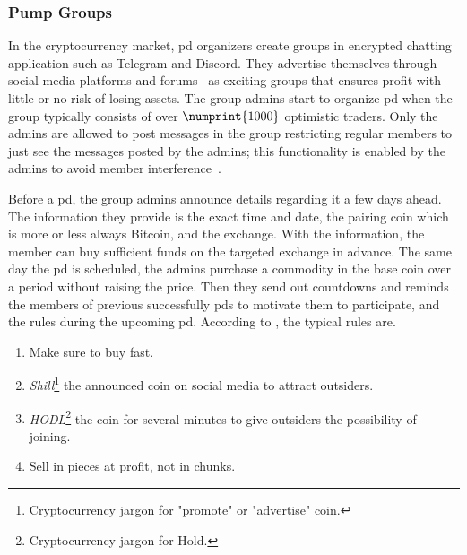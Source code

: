 \subsubsection{Pump Groups}\label{sec:pump_groups}
In the cryptocurrency market, \ac{pd} organizers create groups in encrypted chatting application such as Telegram and Discord. They advertise themselves through social media platforms and forums~\cite{P&D_scheme} as exciting groups that ensures profit with little or no risk of losing assets. The group admins start to organize \ac{pd} when the group typically consists of over $\numprint{1000}$ optimistic traders. Only the admins are allowed to post messages in the group restricting regular members to just see the messages posted by the admins; this functionality is enabled by the admins to avoid member interference~\cite{P&D_anatomy}.

Before a \ac{pd}, the group admins announce details regarding it a few days ahead. The information they provide is the exact time and date, the pairing coin which is more or less always Bitcoin, and the exchange. With the information, the member can buy sufficient funds on the targeted exchange in advance. The same day the \ac{pd} is scheduled, the admins purchase a commodity in the base coin over a period without raising the price. Then they send out countdowns and reminds the members of previous successfully \acp{pd} to motivate them to participate, and the rules during the upcoming \ac{pd}. According to \cite{P&D_anatomy}, the typical rules are.

\begin{enumerate}
    \item Make sure to buy fast.
    \item \emph{Shill}\footnote{Cryptocurrency jargon for "promote" or "advertise" coin.} the announced coin on social media to attract outsiders.
    \item \emph{HODL}\footnote{Cryptocurrency jargon for Hold.} the coin for several minutes to give outsiders the possibility of joining.
    \item Sell in pieces at profit, not in chunks.
\end{enumerate}

